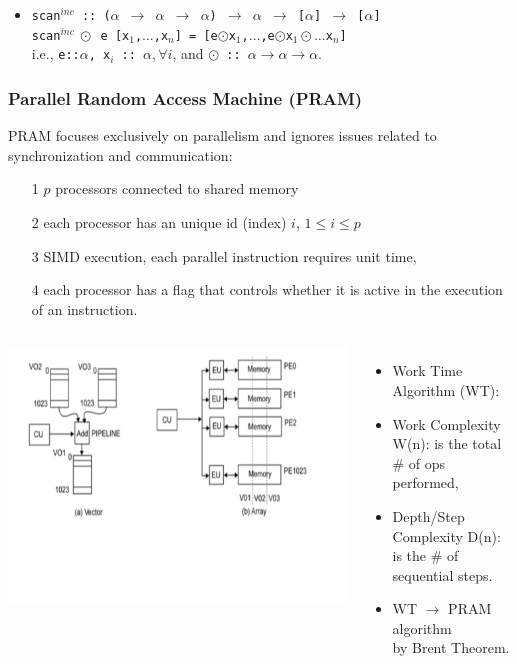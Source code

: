 \documentclass{beamer}
\renewcommand{\emph}[1]{\textcolor{structure}{#1}}
\newcommand{\emp}[1]{\textcolor{DikuRed}{ #1}}
\begin{document}
\begin{frame}[fragile,t]
\begin{itemize}
    \item \emp{{\tt scan$^{inc}$~::~($\alpha$~$\rightarrow$~$\alpha$~$\rightarrow$~$\alpha$)~$\rightarrow$~$\alpha$~$\rightarrow$~[$\alpha$]~$\rightarrow$~[$\alpha$]}}\\
        \emph{\tt scan$^{inc}~\odot$~e~[x$_1$,$\ldots$,x$_n$]~=~[e$\odot$x$_1$,$\ldots$,e$\odot$x$_1\odot\ldots$x$_{n}$]}\\
        i.e., \emp{{\tt{}e::$\alpha$, x$_i$~::~$\alpha, \forall i$}}, and 
        \emp{\tt $\odot$~::~$\alpha\rightarrow\alpha\rightarrow\alpha$}.

\end{itemize}

\end{frame}

\begin{frame}[fragile,t]
  \frametitle{Parallel Random Access Machine (PRAM)}

PRAM focuses exclusively on parallelism and ignores issues
related to synchronization and communication:
\begin{itemize}
    \item[1] $p$ processors connected to shared memory
    \item[2] each processor has an unique id (index) $i$, $1 \leq i \leq p$
    \item[3] SIMD execution, each parallel instruction requires unit time,
    \item[4] each processor has a flag that controls whether it is active
                in the execution of an instruction.
\end  {itemize}


\begin{columns}
\includegraphics[height=37ex]{Figures/L2/VectorMachine}
\vspace{-15ex}
\begin{itemize}
    \item \emp{Work Time Algorithm (WT):}
    \item \emp{Work Complexity W(n)}: is the total \# of ops performed,
    \item \emp{Depth/Step Complexity D(n)}: is the \# of sequential steps.\medskip
    \item \emph{WT $\longrightarrow$ PRAM algorithm\\by Brent Theorem}.
\end{itemize}
\end{columns}

\end{frame}
\end{document}
